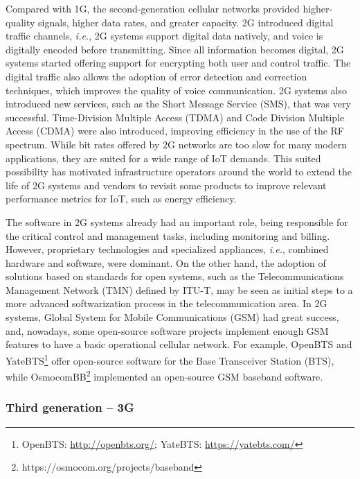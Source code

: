 Compared with 1G, the second-generation cellular networks provided higher-quality signals, higher data rates, and greater capacity. 2G introduced digital traffic channels, \textit{i.e.}, 2G systems support digital data natively, and voice is digitally encoded before transmitting. Since all information becomes digital, 2G systems started offering support for encrypting both user and control traffic. The digital traffic also allows the adoption of error detection and correction techniques, which improves the quality of voice communication. 2G systems also introduced new services, such as the Short Message Service (SMS), that was very successful. Time-Division Multiple Access (TDMA) and Code Division Multiple Access (CDMA) were also introduced, improving efficiency in the use of the RF spectrum. While bit rates offered by 2G networks are too slow for many modern applications, they are suited for a wide range of IoT demands. This suited possibility has motivated infrastructure operators around the world to extend the life of 2G systems and vendors to revisit some products to improve relevant performance metrics for IoT, such as energy efficiency.

The software in 2G systems already had an important role, being responsible for the critical control and management tasks, including monitoring and billing. However, proprietary technologies and specialized appliances, \textit{i.e.}, combined hardware and software, were dominant. On the other hand, the adoption of solutions based on standards for open systems, such as the Telecommunications Management Network (TMN) defined by ITU-T, may be seen as initial steps to a more advanced softwarization process in the telecommunication area. In 2G systems, Global System for Mobile Communications (GSM) had great success, and, nowadays, some open-source software projects implement enough GSM features to have a basic operational cellular network. For example, OpenBTS and YateBTS\footnote{OpenBTS: \url{http://openbts.org/}; YateBTS: \url{https://yatebts.com/}} offer open-source software for the Base Transceiver Station (BTS), while OsmocomBB\footnote{https://osmocom.org/projects/baseband} implemented an open-source GSM baseband software.

\subsubsection*{Third generation -- 3G}

